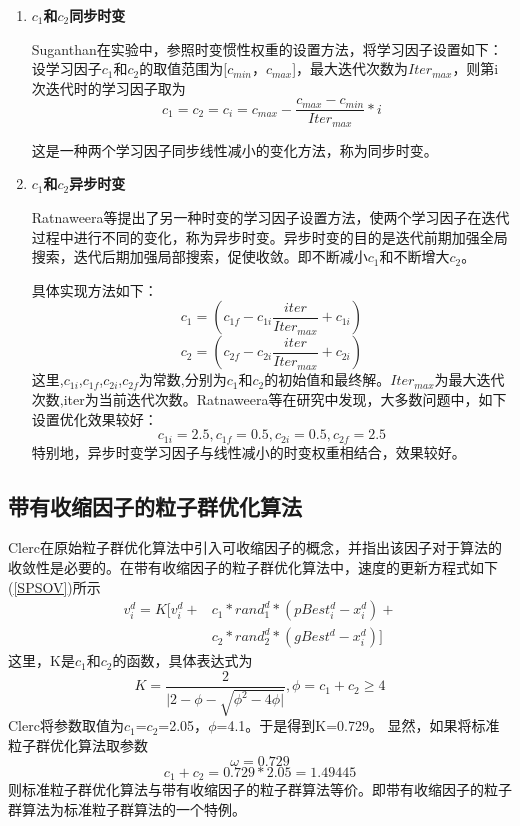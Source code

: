 \begin{enumerate}
	\item \textbf{$c_1$和$c_2$同步时变}
	
	\hspace{2em}Suganthan在实验中，参照时变惯性权重的设置方法，将学习因子设置如下：设学习因子$c_1$和$c_2$的取值范围为[$c_{min}$，$c_{max}$]，最大迭代次数为$Iter_{max}$，则第i次迭代时的学习因子取为$$c_1=c_2=c_i=c_{max}-\frac{c_{max}-c_{min}}{{Iter}_{max}}*i$$
	
	\hspace{2em}这是一种两个学习因子同步线性减小的变化方法，称为同步时变。
	
	\item \textbf{$c_1$和$c_2$异步时变}
	
	\hspace{2em}Ratnaweera等提出了另一种时变的学习因子设置方法，使两个学习因子在迭代过程中进行不同的变化，称为异步时变。异步时变的目的是迭代前期加强全局搜索，迭代后期加强局部搜索，促使收敛。即不断减小$c_1$和不断增大$c_2$。
	
	\hspace{2em}具体实现方法如下：$$c_1=(c_{1f}-c_{1i}\frac{iter}{{Iter}_{max}}+c_{1i})$$
	$$c_2=(c_{2f}-c_{2i}\frac{iter}{{Iter}_{max}}+c_{2i})$$
	\hspace{2em}这里,$c_{1i}$,$c_{1f}$,$c_{2i}$,$c_{2f}$为常数,分别为$c_1$和$c_2$的初始值和最终解。${Iter}_{max}$为最大迭代次数,iter为当前迭代次数。Ratnaweera等在研究中发现，大多数问题中，如下设置优化效果较好：$$c_{1i}=2.5,c_{1f}=0.5,c_{2i}=0.5,c_{2f}=2.5$$\hspace{2em}特别地，异步时变学习因子与线性减小的时变权重相结合，效果较好。

\end{enumerate}

\subsection{带有收缩因子的粒子群优化算法}
Clerc在原始粒子群优化算法中引入可收缩因子的概念，并指出该因子对于算法的收敛性是必要的。在带有收缩因子的粒子群优化算法中，速度的更新方程式如下(\ref{SPSOV})所示
\begin{equation}
\begin{split}
\label{SPSOV}
v_i^d=K[v_i^d+&c_1*rand_1^d*(pBest_i^d-x_i^d)+\\
&c_2*rand_2^d*(gBest^d-x_i^d)]
\end{split}
\end{equation}
这里，K是$c_1$和$c_2$的函数，具体表达式为
\begin{equation}
K=\frac{2}{|2-\phi-\sqrt{\phi^2-4\phi|}},\phi=c_1+c_2\ge4
\end{equation}
Clerc将参数取值为$c_1$=$c_2$=2.05，$\phi$=4.1。于是得到K=0.729。
显然，如果将标准粒子群优化算法取参数
$$\omega=0.729$$
$$c_1+c_2=0.729*2.05=1.49445$$
则标准粒子群优化算法与带有收缩因子的粒子群算法等价。即带有收缩因子的粒子群算法为标准粒子群算法的一个特例。

